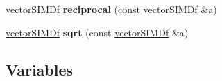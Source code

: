 \begin{DoxyCompactItemize}
\item 
\hyperlink{classirr_1_1core_1_1vectorSIMDf}{vector\+S\+I\+M\+Df} {\bfseries reciprocal} (const \hyperlink{classirr_1_1core_1_1vectorSIMDf}{vector\+S\+I\+M\+Df} \&a)\hypertarget{namespaceirr_1_1core_a37b680d9575ce6b1a8f748eef37efe56}{}\label{namespaceirr_1_1core_a37b680d9575ce6b1a8f748eef37efe56}

\item 
\hyperlink{classirr_1_1core_1_1vectorSIMDf}{vector\+S\+I\+M\+Df} {\bfseries sqrt} (const \hyperlink{classirr_1_1core_1_1vectorSIMDf}{vector\+S\+I\+M\+Df} \&a)\hypertarget{namespaceirr_1_1core_ad0da59bbf77790d8bf3b405595b72fa6}{}\label{namespaceirr_1_1core_ad0da59bbf77790d8bf3b405595b72fa6}

\end{DoxyCompactItemize}
\subsection*{Variables}
